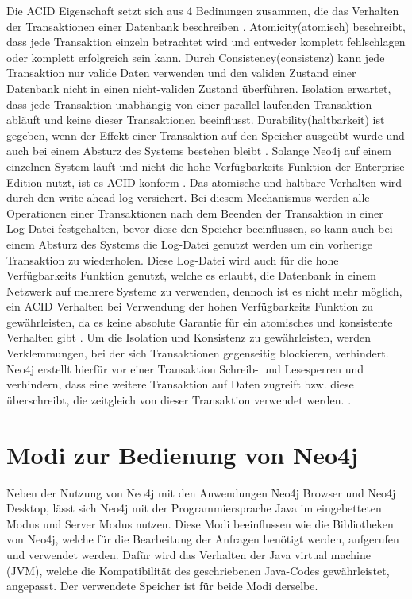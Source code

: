 Die ACID Eigenschaft setzt sich aus 4 Bedinungen zusammen, die das Verhalten der Transaktionen einer  Datenbank beschreiben \parencite{haerder1983principles}. Atomicity(atomisch) beschreibt, dass jede Transaktion einzeln betrachtet wird und entweder komplett fehlschlagen oder komplett erfolgreich sein kann. Durch Consistency(consistenz) kann jede Transaktion nur valide Daten verwenden und den validen Zustand einer Datenbank nicht in einen nicht-validen Zustand überführen. Isolation erwartet, dass jede Transaktion unabhängig von einer parallel-laufenden Transaktion abläuft und keine dieser Transaktionen beeinflusst. Durability(haltbarkeit) ist gegeben, wenn der Effekt einer Transaktion auf den Speicher ausgeübt wurde und auch bei einem Absturz des Systems bestehen bleibt \parencite{haerder1983principles}. \newline Solange Neo4j auf einem einzelnen System läuft und nicht die hohe Verfügbarkeits Funktion der Enterprise Edition nutzt, ist es ACID konform \parencite{holzschuher2013performance}. Das atomische und haltbare Verhalten wird durch den write-ahead log versichert. Bei diesem Mechanismus  werden alle Operationen einer Transaktionen nach dem Beenden der Transaktion in einer Log-Datei  festgehalten, bevor diese  den Speicher beeinflussen, so kann auch bei einem Absturz des Systems die Log-Datei genutzt werden um ein vorherige Transaktion zu wiederholen. Diese Log-Datei wird auch für die  hohe Verfügbarkeits Funktion genutzt, welche es erlaubt, die Datenbank in einem Netzwerk auf mehrere Systeme zu verwenden, dennoch ist es nicht mehr möglich, ein  ACID Verhalten bei Verwendung der hohen Verfügbarkeits Funktion zu gewährleisten, da es keine absolute Garantie für ein  atomisches und konsistente Verhalten gibt \parencite{vukotic2015neo4j}. Um die Isolation und Konsistenz zu gewährleisten, werden Verklemmungen, bei der sich Transaktionen gegenseitig blockieren, verhindert. Neo4j erstellt hierfür vor einer Transaktion Schreib- und Lesesperren und verhindern, dass eine weitere Transaktion auf Daten zugreift bzw. diese überschreibt, die zeitgleich von dieser Transaktion verwendet werden. \parencite{raj2015neo4j}.
\section {Modi zur Bedienung von Neo4j}
Neben der Nutzung von Neo4j mit den Anwendungen Neo4j  Browser und Neo4j Desktop, lässt sich Neo4j mit der Programmiersprache Java im eingebetteten Modus und Server Modus nutzen. Diese Modi beeinflussen wie die Bibliotheken von Neo4j, welche für die Bearbeitung der Anfragen benötigt werden, aufgerufen und verwendet werden. Dafür wird das Verhalten der Java virtual machine (JVM), welche die Kompatibilität des geschriebenen Java-Codes gewährleistet, angepasst. Der verwendete Speicher ist für beide Modi derselbe.

